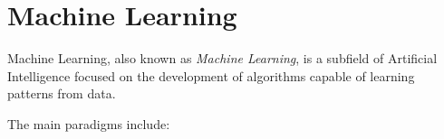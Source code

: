 \section{Machine Learning}

Machine Learning, also known as \textit{Machine Learning}, is a subfield of
Artificial Intelligence focused on the development of algorithms capable of learning patterns from
data.

The main paradigms include: 